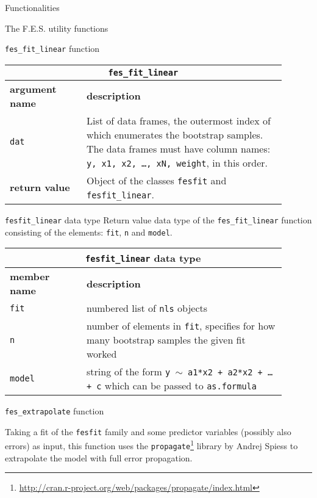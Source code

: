 \documentclass[10pt,a4paper]{article}
\begin{document}
\begin{section}{Functionalities}
\begin{subsection}{The F.E.S. utility functions}
\begin{subsubsection}{ {\tt fes\_fit\_linear} function }
{ \centering
\begin{tabular}{|p{0.25\linewidth}|p{0.65\linewidth}|}
\hline
\multicolumn{2}{|c|}{ {\tt fes\_fit\_linear} } \\
\hline \hline \textbf{argument name} & \textbf{description} \\ \hline
{\tt dat} & List of data frames, the outermost index of which enumerates the bootstrap samples.
The data frames must have column names: {\tt y, x1, x2, \ldots, xN, weight}, in this order. \\
\hline 
\textbf{return value} & Object of the classes {\tt fesfit} and {\tt fesfit\_linear}. \\
\hline
\end{tabular}
} %

\end{subsubsection}

\begin{subsubsection}{ {\tt fesfit\_linear} data type }
Return value data type of the {\tt fes\_fit\_linear} function consisting of the elements: {\tt fit}, {\tt n} and {\tt model}.

{ \centering
\begin{tabular}{|p{0.25\linewidth}|p{0.65\linewidth}|}
\hline
\multicolumn{2}{|c|}{ {\tt fesfit\_linear} data type } \\
\hline \hline \textbf{member name} & \textbf{description} \\ \hline
{\tt fit} & numbered list of {\tt nls} objects \\ 
{\tt n}  & number of elements in {\tt fit}, specifies for how many bootstrap samples the given fit worked \\ 
{\tt model} & string of the form {\tt y $\sim$ a1*x2 + a2*x2 + \ldots + c} which can be passed to {\tt as.formula} \\
\hline 
\end{tabular}
} %

\end{subsubsection}

\begin{subsubsection}{ {\tt fes\_extrapolate} function }

Taking a fit of the {\tt fesfit} family and some predictor variables (possibly also errors) as input, this function uses the {\tt propagate}\footnote{\url{http://cran.r-project.org/web/packages/propagate/index.html}} library by Andrej Spiess to extrapolate the model with full error propagation.


\end{subsubsection}
\end{subsection}
\end{section}
\end{document}

